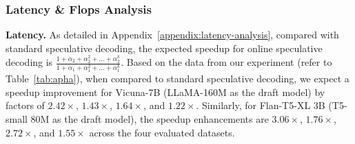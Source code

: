 

\subsubsection{Latency \& Flops Analysis} 
\label{sec:analysis}
{\bf Latency.} As detailed in  Appendix~\ref{appendix:latency-analysis}, compared with standard speculative decoding, 
the expected speedup for online speculative decoding is  \( \frac{1+\alpha_2+\alpha_2^2+...+\alpha_2^{k}}{1+\alpha_1+\alpha_1^2+...+\alpha_1^k}\).
Based on the data from our experiment (refer to Table~\ref{tab:apha}), when compared to standard speculative decoding, 
we expect a speedup %
improvement for Vicuna-7B (LLaMA-160M as the draft model) by factors of \(2.42\times\), \(1.43\times\), \(1.64\times\), and \(1.22\times\). Similarly, for Flan-T5-XL 3B (T5-small 80M as the draft model), the speedup enhancements are \(3.06\times\), \(1.76\times\), \(2.72\times\), and \(1.55\times\) across the four evaluated datasets. %

